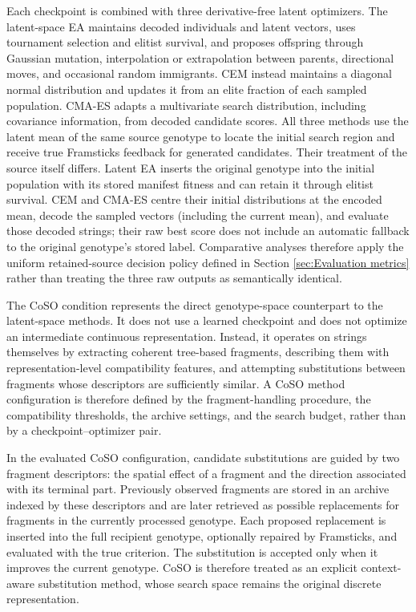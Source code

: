 Each checkpoint is combined with three derivative-free latent optimizers. The latent-space EA maintains decoded individuals and latent vectors, uses tournament selection and elitist survival, and proposes offspring through Gaussian mutation, interpolation or extrapolation between parents, directional moves, and occasional random immigrants. CEM instead maintains a diagonal normal distribution and updates it from an elite fraction of each sampled population. CMA-ES adapts a multivariate search distribution, including covariance information, from decoded candidate scores. All three methods use the latent mean of the same source genotype to locate the initial search region and receive true Framsticks \vertpos{} feedback for generated candidates. Their treatment of the source itself differs. Latent EA inserts the original genotype into the initial population with its stored manifest fitness and can retain it through elitist survival. CEM and CMA-ES centre their initial distributions at the encoded mean, decode the sampled vectors (including the current mean), and evaluate those decoded strings; their raw best score does not include an automatic fallback to the original genotype's stored label. Comparative analyses therefore apply the uniform retained-source decision policy defined in Section \ref{sec:Evaluation metrics} rather than treating the three raw outputs as semantically identical.

The CoSO condition represents the direct genotype-space counterpart to the latent-space methods. It does not use a learned checkpoint and does not optimize an intermediate continuous representation. Instead, it operates on \fone{} strings themselves by extracting coherent tree-based fragments, describing them with representation-level compatibility features, and attempting substitutions between fragments whose descriptors are sufficiently similar. A CoSO method configuration is therefore defined by the fragment-handling procedure, the compatibility thresholds, the archive settings, and the search budget, rather than by a checkpoint--optimizer pair.

In the evaluated CoSO configuration, candidate substitutions are guided by two fragment descriptors: the spatial effect of a fragment and the direction associated with its terminal part. Previously observed fragments are stored in an archive indexed by these descriptors and are later retrieved as possible replacements for fragments in the currently processed genotype. Each proposed replacement is inserted into the full recipient genotype, optionally repaired by Framsticks, and evaluated with the true \vertpos{} criterion. The substitution is accepted only when it improves the current genotype. CoSO is therefore treated as an explicit context-aware substitution method, whose search space remains the original discrete \fone{} representation.

